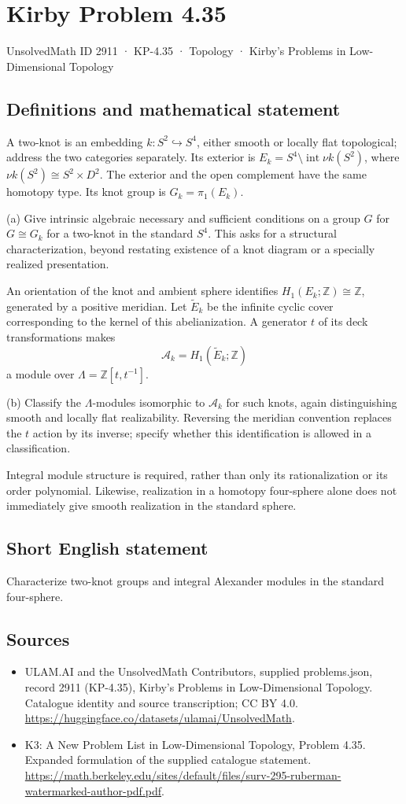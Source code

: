 \documentclass[11pt,a4paper]{article}
\begin{document}
\section*{Kirby Problem 4.35}\label{2911}
{\small UnsolvedMath ID 2911 · KP-4.35 · Topology · Kirby's Problems in Low-Dimensional Topology}
\subsection{Definitions and mathematical statement}
A two-knot is an embedding $k:S^2\hookrightarrow S^4$, either smooth or locally flat topological; address the two categories separately. Its exterior is $E_k=S^4\setminus\operatorname{int}\nu k(S^2)$, where $\nu k(S^2)\cong S^2\times D^2$. The exterior and the open complement have the same homotopy type. Its knot group is $G_k=\pi_1(E_k)$.

(a) Give intrinsic algebraic necessary and sufficient conditions on a group $G$ for $G\cong G_k$ for a two-knot in the standard $S^4$. This asks for a structural characterization, beyond restating existence of a knot diagram or a specially realized presentation.

An orientation of the knot and ambient sphere identifies $H_1(E_k;\mathbb Z)\cong\mathbb Z$, generated by a positive meridian. Let $\widetilde E_k$ be the infinite cyclic cover corresponding to the kernel of this abelianization. A generator $t$ of its deck transformations makes
\[
\mathcal A_k=H_1(\widetilde E_k;\mathbb Z)
\]
a module over $\Lambda=\mathbb Z[t,t^{-1}]$.

(b) Classify the $\Lambda$-modules isomorphic to $\mathcal A_k$ for such knots, again distinguishing smooth and locally flat realizability. Reversing the meridian convention replaces the $t$ action by its inverse; specify whether this identification is allowed in a classification.

Integral module structure is required, rather than only its rationalization or its order polynomial. Likewise, realization in a homotopy four-sphere alone does not immediately give smooth realization in the standard sphere.
\subsection{Short English statement}
Characterize two-knot groups and integral Alexander modules in the standard four-sphere.
\subsection{Sources}
\begin{itemize}
\item[S1] ULAM.AI and the UnsolvedMath Contributors, supplied problems.json, record 2911 (KP-4.35), Kirby's Problems in Low-Dimensional Topology. Catalogue identity and source transcription; CC BY 4.0.
\url{https://huggingface.co/datasets/ulamai/UnsolvedMath}.
\item[S2] K3: A New Problem List in Low-Dimensional Topology, Problem 4.35. Expanded formulation of the supplied catalogue statement.
\url{https://math.berkeley.edu/sites/default/files/surv-295-ruberman-watermarked-author-pdf.pdf}.
\end{itemize}
\end{document}
